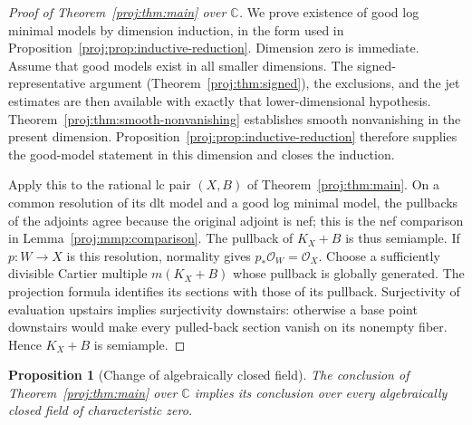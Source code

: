 \documentclass[11pt,letterpaper]{article}
\newcommand{\C}{\mathbb{C}}
\newcommand{\OO}{\mathcal{O}}
\newtheorem{proposition}[theorem]{Proposition}
\theoremstyle{definition}
\theoremstyle{remark}
\begin{document}
\begin{proof}[Proof of Theorem~\ref{proj:thm:main} over \(\C\)]
We prove existence of good log minimal models by dimension induction,
in the form used in Proposition~\ref{proj:prop:inductive-reduction}.
Dimension zero is immediate. Assume that good models exist in all
smaller dimensions. The signed-representative argument
(Theorem~\ref{proj:thm:signed}), the exclusions, and the jet estimates are
then available with exactly that lower-dimensional hypothesis.
Theorem~\ref{proj:thm:smooth-nonvanishing} establishes smooth
nonvanishing in the present dimension. Proposition~\ref{proj:prop:inductive-reduction}
therefore supplies the good-model statement in this dimension and
closes the induction.

Apply this to the rational lc pair \((X,B)\) of
Theorem~\ref{proj:thm:main}. On a common resolution of its dlt model and a
good log minimal model, the pullbacks of the adjoints agree because
the original adjoint is nef; this is the nef comparison in
Lemma~\ref{proj:mmp:comparison}. The pullback of \(K_X+B\)
is thus semiample. If \(p:W\to X\) is this resolution, normality gives
\(p_*\OO_W=\OO_X\). Choose a sufficiently divisible Cartier multiple
\(m(K_X+B)\) whose pullback is globally generated. The projection
formula identifies its sections with those of its pullback.
Surjectivity of evaluation upstairs implies surjectivity downstairs:
otherwise a base point downstairs would make every pulled-back
section vanish on its nonempty fiber. Hence \(K_X+B\) is semiample.
\end{proof}

\begin{proposition}[Change of algebraically closed field]\label{proj:prop:field-descent}
The conclusion of Theorem~\ref{proj:thm:main} over \(\C\) implies its
conclusion over every algebraically closed field of characteristic zero.
\end{proposition}
\end{document}
